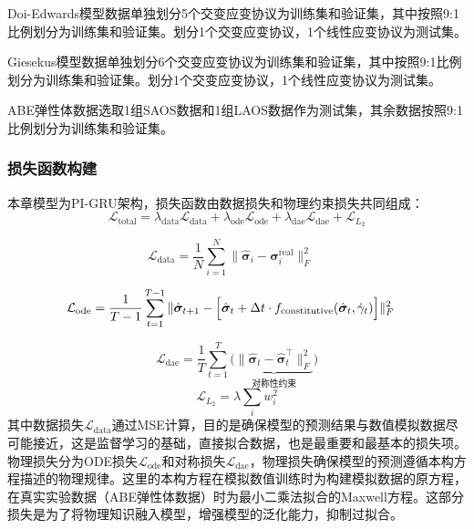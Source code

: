 Doi-Edwards模型数据单独划分5个交变应变协议为训练集和验证集，其中按照9:1比例划分为训练集和验证集。划分1个交变应变协议，1个线性应变协议为测试集。

Giesekus模型数据单独划分6个交变应变协议为训练集和验证集，其中按照9:1比例划分为训练集和验证集。划分1个交变应变协议，1个线性应变协议为测试集。

ABE弹性体数据选取1组SAOS数据和1组LAOS数据作为测试集，其余数据按照9:1比例划分为训练集和验证集。
\subsubsection{损失函数构建}
本章模型为PI-GRU架构，损失函数由数据损失和物理约束损失共同组成：
\begin{equation}
  \mathcal{L}_{\text{total}} =
  \lambda_{\text{data}} \mathcal{L}_{\text{data}} +
  \lambda_{\text{ode}} \mathcal{L}_{\text{ode}} +
  \lambda_{\text{dae}} \mathcal{L}_{\text{dae}}+
  \mathcal{L}_{L_{2}}
\end{equation}

\begin{equation}
  \mathcal{L}_{\text{data}} = \frac{1}{N} \sum_{i=1}^N
  \|\hat{\bm{\sigma}}_i - \bm{\sigma}_i^{\text{real}}\|_F^2
  \quad
\end{equation}

\begin{equation}
  \mathcal{L}_{\text{ode}} = \frac{1}{T-1} \sum_{t=1}^{T-1}
  \|\hat{\bm{\sigma}}_{t+1} - \Bigl[
    \hat{\bm{\sigma}}_t + \Delta t \cdot
    f_{\text{constitutive}}(\hat{\bm{\sigma}}_t, \dot{\gamma}_t)
    \Bigr] \|_F^2
  \quad
\end{equation}

\begin{equation}
  \mathcal{L}_{\text{dae}} = \frac{1}{T} \sum_{t=1}^T \Biggl(
  \underbrace{\|\hat{\bm{\sigma}}_t - \hat{\bm{\sigma}}_t^\top\|_F^2}_{\text{对称性约束}}
  \Biggr)
\end{equation}
\begin{equation}
  \mathcal{L}_{L_{2}} = \lambda \sum_{i} w_i^2
\end{equation}
其中数据损失$\mathcal{L}_{\text{data}}$通过MSE计算，目的是确保模型的预测结果与数值模拟数据尽可能接近，这是监督学习的基础，直接拟合数据，也是最重要和最基本的损失项。物理损失分为ODE损失$\mathcal{L}_{\text{ode}}$和对称损失$\mathcal{L}_{\text{dae}}$，物理损失确保模型的预测遵循本构方程描述的物理规律。这里的本构方程在模拟数值训练时为构建模拟数据的原方程，在真实实验数据（ABE弹性体数据）时为最小二乘法拟合的Maxwell方程。这部分损失是为了将物理知识融入模型，增强模型的泛化能力，抑制过拟合。
